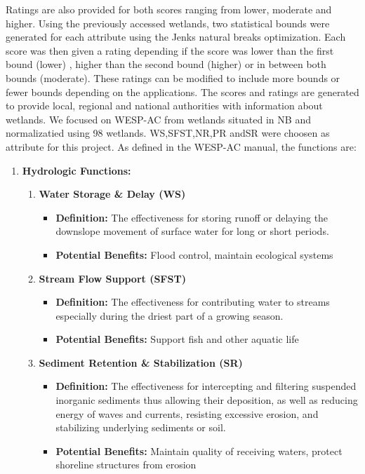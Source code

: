 \documentclass[12pt,letterpaper]{article}
\begin{document}
Ratings are also provided for both scores ranging from lower, moderate and higher.
Using the previously accessed wetlands, two statistical bounds were generated for each attribute using the Jenks natural breaks optimization.
Each score was then given a rating depending if the score was lower than the first bound (lower) , higher than the second bound (higher) or in between both bounds (moderate).
These ratings can be modified to include more bounds or fewer bounds depending on the applications.
The scores and ratings are generated to provide local, regional and national authorities with information about wetlands.
We focused on WESP-AC from wetlands situated in \acf{NB} and normalizatied using 98 wetlands.
WS,\ac{SFST},\ac{NR},\ac{PR} and\ac{SR} were choosen as attribute for this project.
As defined in the WESP-AC manual, the functions are:
\begin{enumerate}
    \item \textbf{Hydrologic Functions:}

    \begin{enumerate}
        \item \textbf{Water Storage \& Delay (WS)}
        \begin{itemize}
            \item \textbf{Definition:} The effectiveness for storing runoff or delaying the downslope movement of surface water for long or short periods.
            \item \textbf{Potential Benefits:} Flood control, maintain ecological systems
        \end{itemize}

        \item \textbf{Stream Flow Support (SFST)}
        \begin{itemize}
            \item \textbf{Definition:} The effectiveness for contributing water to streams especially during the driest part of a growing season.
            \item \textbf{Potential Benefits:} Support fish and other aquatic life
        \end{itemize}

        \item \textbf{Sediment Retention \& Stabilization (SR)}
        \begin{itemize}
            \item \textbf{Definition:} The effectiveness for intercepting and filtering suspended inorganic sediments thus allowing their deposition, as well as reducing energy of waves and currents, resisting excessive erosion, and stabilizing underlying sediments or soil.
            \item \textbf{Potential Benefits:} Maintain quality of receiving waters, protect shoreline structures from erosion
        \end{itemize}


\end{enumerate}
\end{enumerate}
\end{document}
